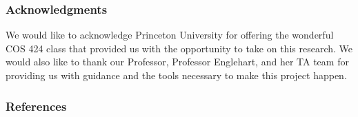 \documentclass{article} %
\begin{document}
\subsubsection*{Acknowledgments}
We would like to acknowledge Princeton University for offering the wonderful COS 424 class that provided us with the opportunity to take on this research. We would also like to thank our Professor, Professor Englehart, and her TA team for providing us with guidance and the tools necessary to make this project happen.


\subsubsection*{References}
\end{document}
